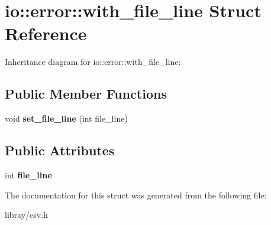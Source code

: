 \hypertarget{structio_1_1error_1_1with__file__line}{}\section{io\+:\+:error\+:\+:with\+\_\+file\+\_\+line Struct Reference}
\label{structio_1_1error_1_1with__file__line}


Inheritance diagram for io\+:\+:error\+:\+:with\+\_\+file\+\_\+line\+:
\subsection*{Public Member Functions}
\begin{DoxyCompactItemize}
\item 
\mbox{\label{structio_1_1error_1_1with__file__line_aa92778a81778abc676ec6ee9952bba8c}} 
void {\bfseries set\+\_\+file\+\_\+line} (int file\+\_\+line)
\end{DoxyCompactItemize}
\subsection*{Public Attributes}
\begin{DoxyCompactItemize}
\item 
\mbox{\label{structio_1_1error_1_1with__file__line_a391298c37172bcdb83aeb3daf65d5a0e}} 
int {\bfseries file\+\_\+line}
\end{DoxyCompactItemize}


The documentation for this struct was generated from the following file\+:\begin{DoxyCompactItemize}
\item 
libray/csv.\+h\end{DoxyCompactItemize}
